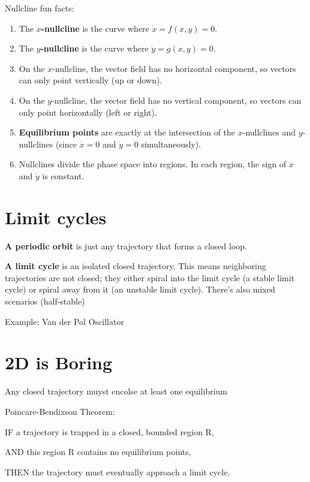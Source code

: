 Nullcline fun facts:
\begin{enumerate}
  \item The \textbf{$x$-nullcline} is the curve where $\dot{x} = f(x,y) = 0$.
  \item The \textbf{$y$-nullcline} is the curve where $\dot{y} = g(x,y) = 0$.
  \item On the $x$-nullcline, the vector field has no horizontal component, so vectors can only point vertically (up or down).
  \item On the $y$-nullcline, the vector field has no vertical component, so vectors can only point horizontally (left or right).
  \item \textbf{Equilibrium points} are exactly at the intersection of the $x$-nullclines and $y$-nullclines (since $\dot{x}=0$ and $\dot{y}=0$ simultaneously).
  \item Nullclines divide the phase space into regions. In each region, the sign of $\dot{x}$ and $\dot{y}$ is constant.
\end{enumerate}

\section*{Limit cycles}

\textbf{A periodic orbit} is just any trajectory that forms a closed loop.

\textbf{A limit cycle} is an isolated closed trajectory. 
This means neighboring trajectories are not closed; they either spiral into the limit cycle (a stable limit cycle) or spiral away from it (an unstable limit cycle).
There's also mixed scenarios (half-stable)

Example: Van der Pol Oscillator

\section*{2D is Boring}

\begin{theorem}
Any closed trajectory muyst encolse at least one equilibrium
\end{theorem}
\begin{theorem}{Poincare-Bendixson Theorem:}

IF a trajectory is trapped in a closed, bounded region R,

AND this region R contains no equilibrium points,

THEN the trajectory must eventually approach a limit cycle.
\end{theorem}

